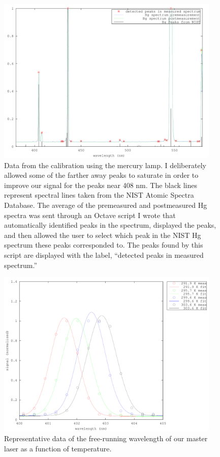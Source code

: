 \begin{figure}
\centering
\includegraphics[width=0.95\textwidth]{calibrationData} 
\caption[Calibration spectrum from Hg lamp]{\label{calibrationData} Data from the calibration using the mercury lamp. I deliberately allowed some of the farther away peaks to saturate in order to improve our signal for the peaks near 408 nm. The black lines represent spectral lines taken from the NIST Atomic Spectra Database\cite{NISTasd}. The average of the premeasured and postmeasured Hg spectra was sent through an Octave script I wrote that automatically identified peaks in the spectrum, displayed the peaks, and then allowed the user to select which peak in the NIST Hg spectrum these peaks corresponded to. The peaks found by this script are displayed with the label, ``detected peaks in measured spectrum.''}
\end{figure}
\begin{figure}
\centering
\includegraphics[width=0.95\textwidth]{temperatureFit} 
\caption[Wavelength of master laser at different temperatures]{\label{Temperaturespectra} Representative data of the free-running wavelength of our master laser as a function of temperature.}
\end{figure}

